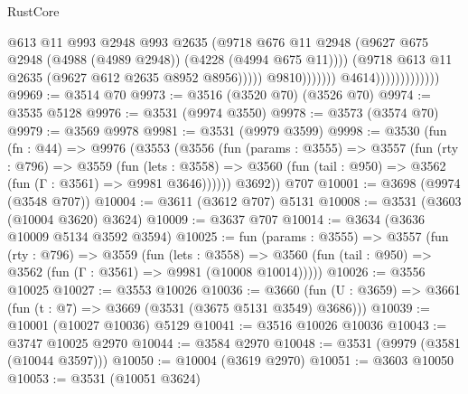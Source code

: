 \begin{lexlean}{RustCore}
\begin{coremodule}
                                                  @613
                                                  @11
                                                  @993
                                                  @2948
                                                  @993
                                                  @2635
                                                  (@9718
                                                    @676
                                                    @11
                                                    @2948
                                                    (@9627
                                                      @675
                                                      @2948
                                                      (@4988 (@4989 @2948))
                                                      (@4228 (@4994 @675 @11))))
                                                  (@9718
                                                    @613
                                                    @11
                                                    @2635
                                                    (@9627 @612 @2635 @8952 @8956)))))
                                            @9810)))))))
                              @4614)))))))))))))
@9969 := @3514 @70
@9973 := @3516 (@3520 @70) (@3526 @70)
@9974 := @3535 @5128
@9976 := @3531 (@9974 @3550)
@9978 := @3573 (@3574 @70)
@9979 := @3569 @9978
@9981 := @3531 (@9979 @3599)
@9998 := @3530
    (fun (fn : @44) =>
    @9976
      (@3553
        (@3556
          (fun (params : @3555) =>
          @3557
            (fun (rty : @796) =>
            @3559
              (fun (lets : @3558) =>
              @3560 (fun (tail : @950) => @3562 (fun (Γ : @3561) => @9981 @3646))))))
        @3692))
    @707
@10001 := @3698 (@9974 (@3548 @707))
@10004 := @3611 (@3612 @707) @5131
@10008 := @3531 (@3603 (@10004 @3620) @3624)
@10009 := @3637 @707
@10014 := @3634 (@3636 @10009 @5134 @3592 @3594)
@10025 := fun (params : @3555) =>
  @3557
    (fun (rty : @796) =>
    @3559
      (fun (lets : @3558) =>
      @3560 (fun (tail : @950) => @3562 (fun (Γ : @3561) => @9981 (@10008 @10014)))))
@10026 := @3556 @10025
@10027 := @3553 @10026
@10036 := @3660 (fun (U : @3659) => @3661 (fun (t : @7) => @3669 (@3531 (@3675 @5131 @3549) @3686)))
@10039 := @10001 (@10027 @10036) @5129
@10041 := @3516 @10026 @10036
@10043 := @3747 @10025 @2970
@10044 := @3584 @2970
@10048 := @3531 (@9979 (@3581 (@10044 @3597)))
@10050 := @10004 (@3619 @2970)
@10051 := @3603 @10050
@10053 := @3531 (@10051 @3624)

\end{coremodule}
\end{lexlean}
